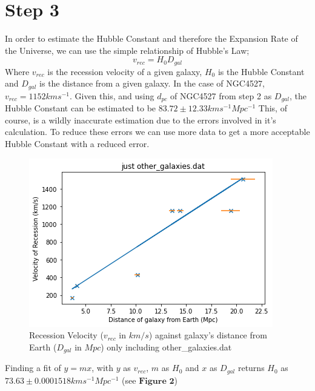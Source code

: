 \documentclass{article}
\begin{document}
    \section{Step 3}
    In order to estimate the Hubble Constant and therefore the Expansion Rate of the Universe, we can use the simple relationship of Hubble's Law;
    \begin{equation}
        v_{rec} = H_0D_{gal}
    \end{equation}
    Where $v_{rec}$ is the recession velocity of a given galaxy, $H_0$ is the Hubble Constant and $D_{gal}$ is the distance from a given galaxy. \newline
    \newline In the case of NGC4527, $v_{rec} = 1152 kms^{-1}$. Given this, and using $d_{pc}$ of NGC4527 from step 2 as $D_{gal}$, the Hubble Constant can be estimated to be \newline $83.72 \pm 12.33 kms^{-1}Mpc^{-1}$
    \newline
    \newline This, of course, is a wildly inaccurate estimation due to the errors involved in it's calculation. To reduce these errors we can use more data to get a more acceptable Hubble Constant with a reduced error.
    \begin{figure}
        \centering
        \includegraphics[scale = 0.7]{../media/images/part3.png}
        \caption{Recession Velocity ($v_{rec}$ in $km/s$) against galaxy's distance from Earth ($D_{gal}$ in $Mpc$) only including other\_galaxies.dat}
    \end{figure}
    \newline
    \newline
    Finding a fit of $y = mx$, with $y$ as $v_{rec}$, $m$ as $H_0$ and $x$ as $D_{gal}$ returns $H_0$ as $73.63 \pm 0.0001518 kms^{-1}Mpc^{-1}$ (see $\textbf{Figure 2}$)
\end{document}

